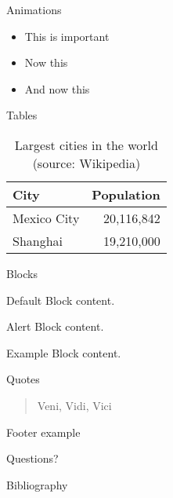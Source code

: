\begin{frame}{Animations}
    \begin{itemize}[<+- | alert@+>]
        \item \alert<4>{This is important}
        \item Now this
        \item And now this
    \end{itemize}
\end{frame}

\begin{frame}{Tables}
    \begin{table}
        \caption{Largest cities in the world (source: Wikipedia)}
        \begin{tabular}{lr}
            \toprule
            City & Population\\
            \midrule
            Mexico City & 20,116,842\\
            Shanghai & 19,210,000\\
            \bottomrule
        \end{tabular}
    \end{table}
\end{frame}

\begin{frame}{Blocks}
    \begin{block}{Default}
        Block content.
    \end{block}

    \begin{alertblock}{Alert}
        Block content.
    \end{alertblock}


    \begin{exampleblock}{Example}
        Block content.
    \end{exampleblock}
\end{frame}

\begin{frame}{Quotes}
    \begin{quote}
        Veni, Vidi, Vici
    \end{quote}
\end{frame}

{%
\begin{frame}{Footer example}
\end{frame}
}

\begin{frame}[standout]
    Questions?
\end{frame}

\begin{frame}[allowframebreaks]{Bibliography}
    \nocite{...}

    
    
\end{frame}
